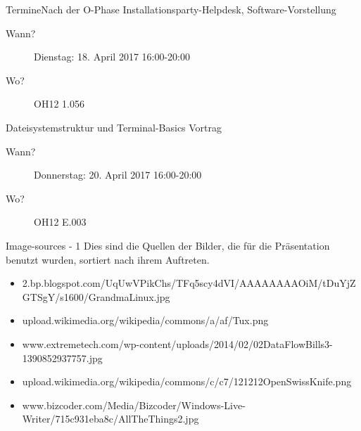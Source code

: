 \begin{frame}{Termine}{Nach der O-Phase}
Installationsparty-Helpdesk, {\large Software-Vorstellung}
 	\begin{center}
	\begin{description}%
		\item[Wann?] Dienstag: 18. April 2017 16:00-20:00
		\item[Wo?] OH12 1.056
	\end{description}
	\end{center}

{ Dateisystemstruktur und {\large Terminal-Basics} Vortrag} 
\pause
   \begin{center}
	\begin{description}%
	 \item[Wann?] Donnerstag: 20. April 2017 16:00-20:00
	 \item[Wo?] OH12 E.003
	\end{description}

	  \end{center}

	
\end{frame}



\begin{frame}{Image-sources - 1}
Dies sind die Quellen der Bilder, die für die Präsentation benutzt wurden, sortiert nach ihrem Auftreten.
\begin{itemize}
	\item [1] 2.bp.blogspot.com/\textunderscore UqUwVPikChs/TFq5scy4dVI/AAAAAAAAOiM/tDuYjZGTSgY/s1600/GrandmaLinux.jpg
	\item [2] upload.wikimedia.org/wikipedia/commons/a/af/Tux.png
	\item [3] www.extremetech.com/wp-content/uploads/2014/02/02DataFlowBills3-1390852937757.jpg
	
	\item [4] upload.wikimedia.org/wikipedia/commons/c/c7/121212\textunderscore OpenSwissKnife.png
	\item [5] www.bizcoder.com/Media/Bizcoder/Windows-Live-Writer/715c931eba8c/AllTheThings\textunderscore 2.jpg
	
\end{itemize}

\end{frame}

